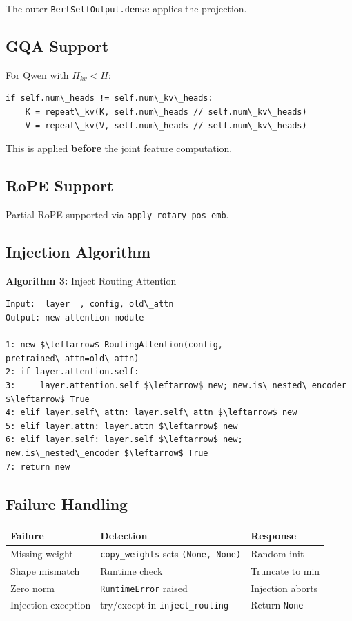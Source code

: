 The outer \texttt{BertSelfOutput.dense} applies the projection.

\subsection{GQA Support}

For Qwen with $H_{kv} < H$:

\begin{lstlisting}
if self.num\_heads != self.num\_kv\_heads:
    K = repeat\_kv(K, self.num\_heads // self.num\_kv\_heads)
    V = repeat\_kv(V, self.num\_heads // self.num\_kv\_heads)
\end{lstlisting}

This is applied \textbf{before} the joint feature computation.

\subsection{RoPE Support}

Partial RoPE supported via \texttt{apply\_rotary\_pos\_emb}.

\subsection{Injection Algorithm}

\textbf{Algorithm 3:} Inject Routing Attention
\begin{lstlisting}
Input:  layer  , config, old\_attn
Output: new attention module

1: new $\leftarrow$ RoutingAttention(config, pretrained\_attn=old\_attn)
2: if layer.attention.self: 
3:     layer.attention.self $\leftarrow$ new; new.is\_nested\_encoder $\leftarrow$ True
4: elif layer.self\_attn: layer.self\_attn $\leftarrow$ new
5: elif layer.attn: layer.attn $\leftarrow$ new
6: elif layer.self: layer.self $\leftarrow$ new; new.is\_nested\_encoder $\leftarrow$ True
7: return new
\end{lstlisting}

\subsection{Failure Handling}

\begin{table}[H]
\centering
\small
\begin{tabular}{lll}
\toprule
\textbf{Failure} & \textbf{Detection} & \textbf{Response} \\
\midrule
Missing weight & \texttt{copy\_weights} sets \texttt{(None, None)} & Random init \\
Shape mismatch & Runtime check & Truncate to min \\
Zero norm & \texttt{RuntimeError} raised & Injection aborts \\
Injection exception & try/except in \texttt{inject\_routing} & Return \texttt{None} \\
\bottomrule
\end{tabular}
\end{table}

